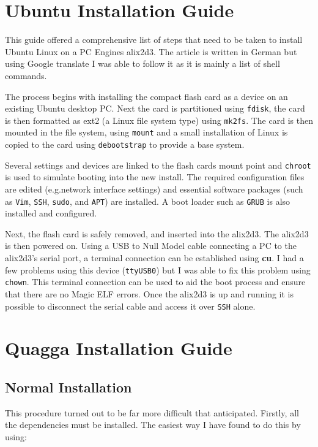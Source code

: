 \section*{Ubuntu Installation Guide}

 This guide\cite{germanGuide} offered a comprehensive list of steps that need to
 be taken to install Ubuntu Linux on a PC Engines alix2d3\cite{alix2d3}.  The article is
 written in German but using Google translate I was able to follow it as it is
 mainly a list of shell commands.

 The process begins with installing the compact flash card as a device on an
 existing Ubuntu desktop PC\@. Next the card is partitioned using \texttt{fdisk},
 the card is then formatted as ext2 (a Linux file system type) using
 \texttt{mk2fs}. The card is then mounted in the file system, using
 \texttt{mount} and a small installation of Linux is copied to the card using
 \texttt{debootstrap} to provide a base system.

 Several settings and devices are linked to the flash cards mount point and
 \texttt{chroot} is used to simulate booting into the new install. The required
 configuration files are edited (e.g.\@ network interface settings) and essential
 software packages (such as \texttt{Vim}, \texttt{SSH}, \texttt{sudo}, and
 \texttt{APT}) are installed. A boot loader such as \texttt{GRUB} is also
 installed and configured.

 Next, the flash card is safely removed, and  inserted into the alix2d3. The
 alix2d3 is then powered on. Using a USB to Null Model cable connecting a PC to
 the alix2d3's serial port, a terminal connection can be established using {\bf
 cu}. I had a few problems using this device (\texttt{ttyUSB0}) but I was able to
 fix this problem using \texttt{chown}. This terminal connection can be used to
 aid the boot process and ensure that there are no Magic ELF errors. Once the
 alix2d3 is up and running it is possible to disconnect the serial cable and
 access it over \texttt{SSH} alone.

 \section*{Quagga Installation Guide}

 \subsection*{Normal Installation}
This procedure turned out to be far more difficult that anticipated. Firstly,
all the dependencies must be installed. The easiest way I have found to do this
by using:

